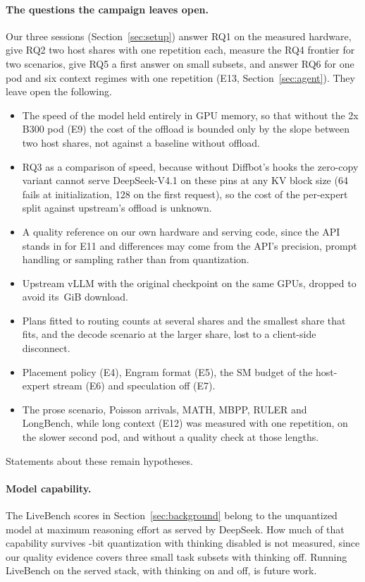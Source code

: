 \paragraph{The questions the campaign leaves open.}
Our three sessions (Section~\ref{sec:setup}) answer RQ1 on the measured hardware, give RQ2 two host shares with one
repetition each, measure the RQ4 frontier for two scenarios, give RQ5 a first answer on small subsets, and answer RQ6
for one pod and six context regimes with one repetition (E13, Section~\ref{sec:agent}). They leave open the following.
\begin{itemize}
\item The speed of the model held entirely in GPU memory, so that without the 2x B300 pod (E9) the cost of the offload
is bounded only by the slope between two host shares, not against a baseline without offload.
\item RQ3 as a comparison of speed, because without Diffbot's hooks the zero-copy variant cannot serve DeepSeek-V4.1 on
these pins at any KV block size (64 fails at initialization, 128 on the first request), so the cost of the per-expert
split against upstream's offload is unknown.
\item A quality reference on our own hardware and serving code, since the API stands in for E11 and differences may
come from the API's precision, prompt handling or sampling rather than from quantization.
\item Upstream vLLM with the original checkpoint on the same GPUs, dropped to avoid its \,GiB download.
\item Plans fitted to routing counts at several shares and the smallest share that fits, and the decode scenario at the
larger share, lost to a client-side disconnect.
\item Placement policy (E4), Engram format (E5), the SM budget of the host-expert stream (E6) and speculation off (E7).
\item The prose scenario, Poisson arrivals, MATH, MBPP, RULER and LongBench, while long context (E12) was measured with
one repetition, on the slower second pod, and without a quality check at those lengths.
\end{itemize}
Statements about these remain hypotheses.

\paragraph{Model capability.}
The LiveBench scores in Section~\ref{sec:background} belong to the unquantized model at maximum reasoning effort as
served by DeepSeek. How much of that capability survives -bit quantization with thinking disabled is
not measured, since our quality evidence covers three small task subsets with thinking off. Running LiveBench on the
served stack, with thinking on and off, is future work.

